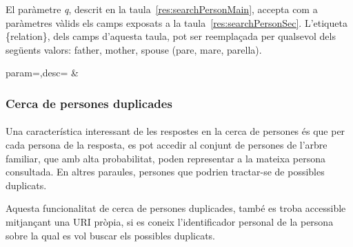          El paràmetre \emph{q}, descrit en la taula~\ref{res:searchPersonMain}, accepta com a paràmetres vàlids els camps exposats a la taula~\ref{res:searchPersonSec}. L'etiqueta \{relation\}, dels camps d'aquesta taula,  pot ser reemplaçada per qualsevol dels següents valors: father, mother, spouse (pare, mare, parella).

         \begin{center}
                  {param=\param,desc=\desc}
                  {\param&\desc}
          \end{center}


          \subsubsection{Cerca de persones duplicades}

          \paragraph{}
          Una característica interessant de les respostes en la cerca de persones és que per cada persona de la resposta, es pot accedir al conjunt de persones de l'arbre familiar, que amb alta probabilitat, poden representar a la mateixa persona consultada. En altres paraules, persones que podrien tractar-se de possibles duplicats.

          Aquesta funcionalitat de cerca de persones duplicades, també es troba accessible mitjançant una URI pròpia, si es coneix l'identificador personal de la persona sobre la qual es vol buscar els possibles duplicats.


